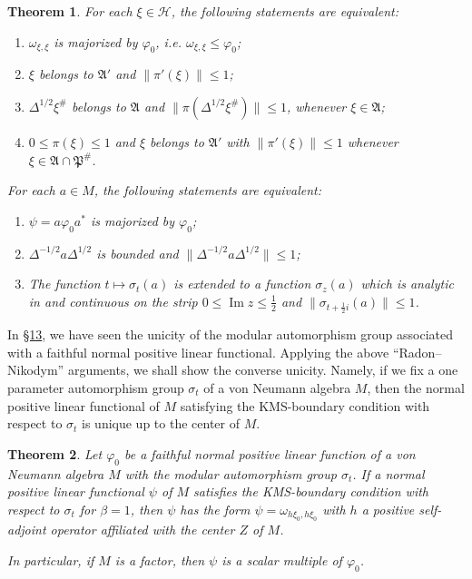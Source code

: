 \documentclass[12pt,b5paper,twoside]{article}
\theoremstyle{takesaki}
\newtheorem{theorem}{Theorem}[section]
\numberwithin{equation}{section}
\begin{document}
\begin{theorem}
\label{thm:15.3}
For each $\xi\in\mathcal H$, the following statements are
equivalent:
\begin{enumerate}[label=A\arabic*$^{\circ}$]
  \item $\omega_{\xi,\xi}$ is majorized by $\varphi_0$, i.e.
  $\omega_{\xi,\xi}\leq\varphi_0$;
  \item $\xi$ belongs to $\mathfrak A'$ and
  $\lVert\pi'(\xi)\rVert\leq1$;
  \item $\Delta^{1/2}\xi^{\#}$ belongs to $\mathfrak A$ and
  $\lVert\pi(\Delta^{1/2}\xi^{\#})\rVert\leq1$, whenever
  $\xi\in\mathfrak A$;
  \item $0\leq\pi(\xi)\leq1$ and $\xi$ belongs to $\mathfrak A'$ with
  $\lVert\pi'(\xi)\rVert\leq1$ whenever
  $\xi\in\mathfrak A\cap\mathfrak P^{\#}$.
\end{enumerate}
For each $a\in M$, the following statements are equivalent:
\begin{enumerate}[label=B\arabic*$^{\circ}$]
  \item $\psi=a\varphi_0a^*$ is majorized by $\varphi_0$;
  \item $\Delta^{-1/2}a\Delta^{1/2}$ is bounded and
  $\lVert\Delta^{-1/2}a\Delta^{1/2}\rVert\leq1$;
  \item The function $t\mapsto\sigma_t(a)$ is extended to a function
  $\sigma_z(a)$ which is analytic in and continuous on the strip
  $0\leq\operatorname{Im}z\leq\tfrac12$ and
  $\lVert\sigma_{t+\frac12 i}(a)\rVert\leq1$.
\end{enumerate}
\end{theorem}

In \hyperref[sec:13]{\S13}, we have seen the unicity of the modular
automorphism group associated with a faithful normal positive linear
functional.  Applying the above ``Radon--Nikodym'' arguments, we shall
show the converse unicity.  Namely, if we fix a one parameter
automorphism group $\sigma_t$ of a von Neumann algebra $M$, then the
normal positive linear functional of $M$ satisfying the KMS-boundary
condition with respect to $\sigma_t$ is unique up to the center of $M$.

\begin{theorem}
\label{thm:15.4}
Let $\varphi_0$ be a faithful normal positive linear function of a von
Neumann algebra $M$ with the modular automorphism group $\sigma_t$.  If
a normal positive linear functional $\psi$ of $M$ satisfies the
KMS-boundary condition with respect to $\sigma_t$ for $\beta=1$, then
$\psi$ has the form $\psi=\omega_{h\xi_0,h\xi_0}$ with $h$ a positive
self-adjoint operator
affiliated with the center $Z$ of $M$.

In particular, if $M$ is a factor, then $\psi$ is a scalar multiple of
$\varphi_0$.
\end{theorem}
\end{document}
